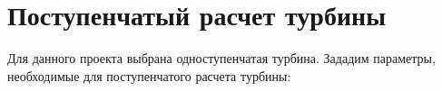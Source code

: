 \section{Поступенчатый расчет турбины}
Для данного проекта выбрана одноступенчатая турбина.
Зададим параметры, необходимые для поступенчатого расчета турбины:




